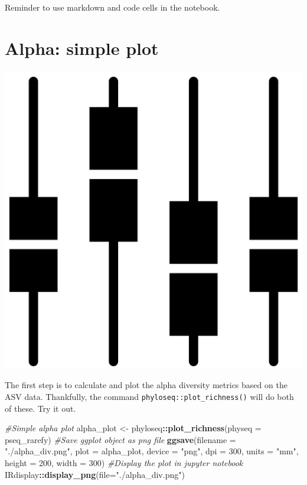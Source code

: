 \documentclass[
]{book}
\newenvironment{Shaded}{\begin{snugshade}}{\end{snugshade}}
\newcommand{\AttributeTok}[1]{\textcolor[rgb]{0.13,0.29,0.53}{#1}}
\newcommand{\CommentTok}[1]{\textcolor[rgb]{0.56,0.35,0.01}{\textit{#1}}}
\newcommand{\DecValTok}[1]{\textcolor[rgb]{0.00,0.00,0.81}{#1}}
\newcommand{\FunctionTok}[1]{\textcolor[rgb]{0.13,0.29,0.53}{\textbf{#1}}}
\newcommand{\NormalTok}[1]{#1}
\newcommand{\OtherTok}[1]{\textcolor[rgb]{0.56,0.35,0.01}{#1}}
\newcommand{\SpecialCharTok}[1]{\textcolor[rgb]{0.81,0.36,0.00}{\textbf{#1}}}
\newcommand{\StringTok}[1]{\textcolor[rgb]{0.31,0.60,0.02}{#1}}
\begin{document}
Reminder to use markdown and code cells in the notebook.

\hypertarget{alpha-simple-plot}{%
\section{Alpha: simple plot}\label{alpha-simple-plot}}

\includegraphics{figures/simple_boxplot.png}

The first step is to calculate and plot the alpha diversity metrics based on the ASV data.
Thankfully, the command \texttt{phyloseq::plot\_richness()} will do both of these.
Try it out.

\begin{Shaded}
\begin{Highlighting}[]
\CommentTok{\#Simple alpha plot}
\NormalTok{alpha\_plot }\OtherTok{\textless{}{-}}\NormalTok{ phyloseq}\SpecialCharTok{::}\FunctionTok{plot\_richness}\NormalTok{(}\AttributeTok{physeq =}\NormalTok{ pseq\_rarefy)}
\CommentTok{\#Save ggplot object as png file}
\FunctionTok{ggsave}\NormalTok{(}\AttributeTok{filename =} \StringTok{"./alpha\_div.png"}\NormalTok{, }\AttributeTok{plot =}\NormalTok{ alpha\_plot,}
       \AttributeTok{device =} \StringTok{"png"}\NormalTok{, }\AttributeTok{dpi =} \DecValTok{300}\NormalTok{, }\AttributeTok{units =} \StringTok{"mm"}\NormalTok{, }\AttributeTok{height =} \DecValTok{200}\NormalTok{, }\AttributeTok{width =} \DecValTok{300}\NormalTok{)}
\CommentTok{\#Display the plot in jupyter notebook}
\NormalTok{IRdisplay}\SpecialCharTok{::}\FunctionTok{display\_png}\NormalTok{(}\AttributeTok{file=}\StringTok{"./alpha\_div.png"}\NormalTok{)}
\end{Highlighting}
\end{Shaded}
\end{document}
